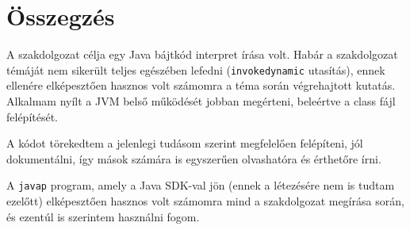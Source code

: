 \chapter{Összegzés}
\label{ch:sum}

A szakdolgozat célja egy Java bájtkód interpret írása volt. Habár a szakdolgozat témáját nem sikerült teljes egészében lefedni (\lstinline{invokedynamic} utasítás), ennek ellenére elképesztően hasznos volt számomra a téma során végrehajtott kutatás. Alkalmam nyílt a JVM belső működését jobban megérteni, beleértve a class fájl felépítését.

A kódot törekedtem a jelenlegi tudásom szerint megfelelően felépíteni, jól dokumentálni, így mások számára is egyszerűen olvashatóra és érthetőre írni.

A \lstinline{javap} program, amely a Java SDK-val jön (ennek a létezésére nem is tudtam ezelőtt) elképesztően hasznos volt számomra mind a szakdolgozat megírása során, és ezentúl is szerintem használni fogom.
